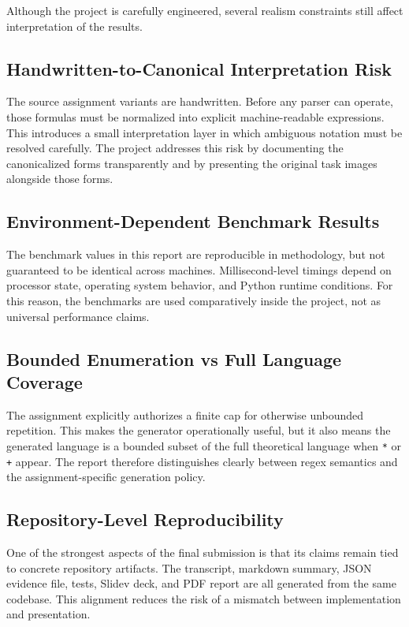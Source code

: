 \documentclass[a4paper,12pt]{article}
\begin{document}
Although the project is carefully engineered, several realism constraints still affect interpretation of the results.

\subsection{Handwritten-to-Canonical Interpretation Risk}

The source assignment variants are handwritten. Before any parser can operate, those formulas must be normalized into explicit machine-readable expressions. This introduces a small interpretation layer in which ambiguous notation must be resolved carefully. The project addresses this risk by documenting the canonicalized forms transparently and by presenting the original task images alongside those forms.

\subsection{Environment-Dependent Benchmark Results}

The benchmark values in this report are reproducible in methodology, but not guaranteed to be identical across machines. Millisecond-level timings depend on processor state, operating system behavior, and Python runtime conditions. For this reason, the benchmarks are used comparatively inside the project, not as universal performance claims.

\subsection{Bounded Enumeration vs Full Language Coverage}

The assignment explicitly authorizes a finite cap for otherwise unbounded repetition. This makes the generator operationally useful, but it also means the generated language is a bounded subset of the full theoretical language when \texttt{*} or \texttt{+} appear. The report therefore distinguishes clearly between regex semantics and the assignment-specific generation policy.

\subsection{Repository-Level Reproducibility}

One of the strongest aspects of the final submission is that its claims remain tied to concrete repository artifacts. The transcript, markdown summary, JSON evidence file, tests, Slidev deck, and PDF report are all generated from the same codebase. This alignment reduces the risk of a mismatch between implementation and presentation.
\end{document}
